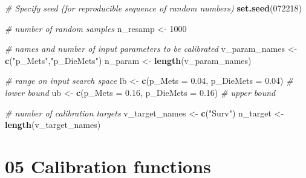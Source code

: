 \documentclass[
]{article}
\newenvironment{Shaded}{\begin{snugshade}}{\end{snugshade}}
\newcommand{\CommentTok}[1]{\textcolor[rgb]{0.56,0.35,0.01}{\textit{#1}}}
\newcommand{\DataTypeTok}[1]{\textcolor[rgb]{0.13,0.29,0.53}{#1}}
\newcommand{\DecValTok}[1]{\textcolor[rgb]{0.00,0.00,0.81}{#1}}
\newcommand{\FloatTok}[1]{\textcolor[rgb]{0.00,0.00,0.81}{#1}}
\newcommand{\KeywordTok}[1]{\textcolor[rgb]{0.13,0.29,0.53}{\textbf{#1}}}
\newcommand{\NormalTok}[1]{#1}
\newcommand{\StringTok}[1]{\textcolor[rgb]{0.31,0.60,0.02}{#1}}
\begin{document}
\begin{Shaded}
\begin{Highlighting}[]
\CommentTok{# Specify seed (for reproducible sequence of random numbers)}
\KeywordTok{set.seed}\NormalTok{(}\DecValTok{072218}\NormalTok{)}

\CommentTok{# number of random samples}
\NormalTok{n_resamp <-}\StringTok{ }\DecValTok{1000}

\CommentTok{# names and number of input parameters to be calibrated}
\NormalTok{v_param_names <-}\StringTok{ }\KeywordTok{c}\NormalTok{(}\StringTok{"p_Mets"}\NormalTok{,}\StringTok{"p_DieMets"}\NormalTok{)}
\NormalTok{n_param <-}\StringTok{ }\KeywordTok{length}\NormalTok{(v_param_names)}

\CommentTok{# range on input search space}
\NormalTok{lb <-}\StringTok{ }\KeywordTok{c}\NormalTok{(}\DataTypeTok{p_Mets =} \FloatTok{0.04}\NormalTok{, }\DataTypeTok{p_DieMets =} \FloatTok{0.04}\NormalTok{) }\CommentTok{# lower bound}
\NormalTok{ub <-}\StringTok{ }\KeywordTok{c}\NormalTok{(}\DataTypeTok{p_Mets =} \FloatTok{0.16}\NormalTok{, }\DataTypeTok{p_DieMets =} \FloatTok{0.16}\NormalTok{) }\CommentTok{# upper bound}

\CommentTok{# number of calibration targets}
\NormalTok{v_target_names <-}\StringTok{ }\KeywordTok{c}\NormalTok{(}\StringTok{"Surv"}\NormalTok{)}
\NormalTok{n_target       <-}\StringTok{ }\KeywordTok{length}\NormalTok{(v_target_names)}
\end{Highlighting}
\end{Shaded}

\hypertarget{calibration-functions}{%
\section{05 Calibration functions}\label{calibration-functions}}
\end{document}
